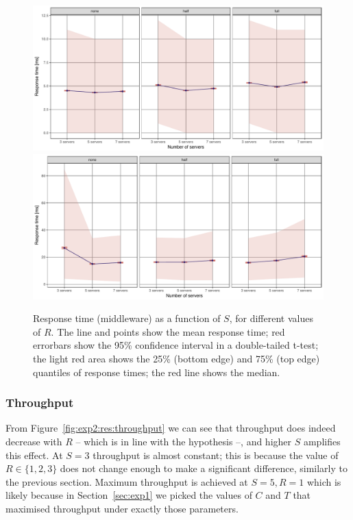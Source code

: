 \documentclass[11pt]{article}
\begin{document}
\begin{figure}[h]
\centering
\includegraphics[width=\textwidth]{../results/replication/graphs/response_time_vs_servers_get.pdf}
\includegraphics[width=\textwidth]{../results/replication/graphs/response_time_vs_servers_set.pdf}
\caption{Response time (middleware) as a function of $S$, for different values of $R$. The line and points show the mean response time; red errorbars show the 95\% confidence interval in a double-tailed t-test; the light red area shows the 25\% (bottom edge) and 75\% (top edge) quantiles of response times; the red line shows the median.}
\label{fig:exp2:res:servers}
\end{figure}

\subsubsection{Throughput}

From Figure~\ref{fig:exp2:res:throughput} we can see that throughput does indeed decrease with $R$ -- which is in line with the hypothesis --, and higher $S$ amplifies this effect. At $S=3$ throughput is almost constant; this is because the value of $R \in \{1,2,3\}$ does not change enough to make a significant difference, similarly to the previous section. Maximum throughput is achieved at $S=5, R=1$ which is likely because in Section~\ref{sec:exp1} we picked the values of $C$ and $T$ that maximised throughput under exactly those parameters.
\end{document}
